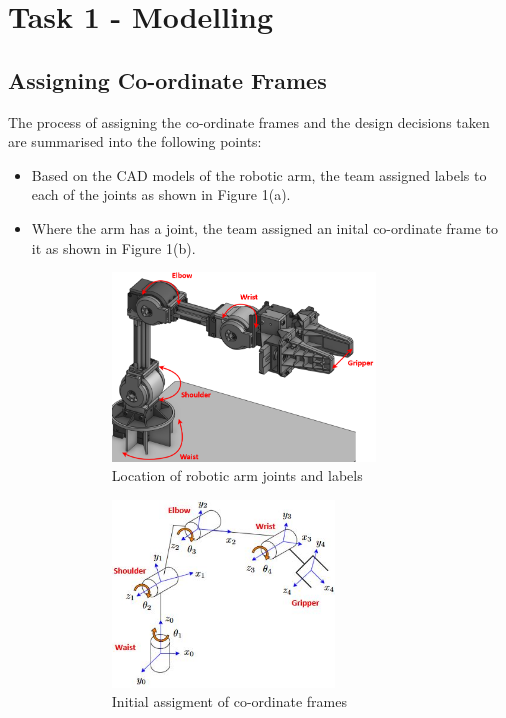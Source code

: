 \documentclass[9pt, a4paper]{article}
\begin{document}
\section{Task 1 - Modelling}

\subsection{Assigning Co-ordinate Frames}

The process of assigning the co-ordinate frames and the design decisions taken
are summarised into the following points:
\begin{itemize}
    \item Based on the CAD models \cite{CAD_model} of the robotic arm, the team assigned labels
    to each of the joints as shown in Figure 1(a).  

    \item Where the arm has a joint, the team assigned an inital co-ordinate
    frame to it as shown in Figure 1(b). 
    \begin{figure}[h!]
      \centering
      \begin{subfigure}{.5\textwidth}
        \centering
        \includegraphics[width=7cm]{Arm diagram.PNG}
        \caption{Location of robotic arm joints and labels}
      \end{subfigure}%
      \begin{subfigure}{.5\textwidth}
        \centering
        \includegraphics[width=5.9cm]{Coodinate frame.JPG}
        \caption{Initial assigment of co-ordinate frames \cite{Coordinate_frame}}
      \end{subfigure}
      \caption{}
    \end{figure}


\end{itemize}
\end{document}
